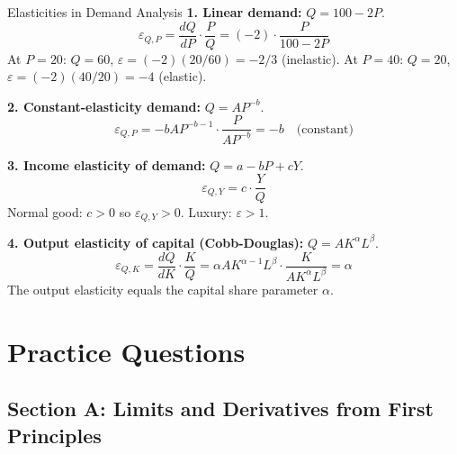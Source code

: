 \documentclass[12pt, a4paper]{article}
\theoremstyle{definition}
\newcommand{\ddd}[2]{\dfrac{d#1}{d#2}}
\begin{document}
\begin{exbox}{Elasticities in Demand Analysis}
\textbf{1. Linear demand:} $Q = 100 - 2P$.
\[
  \varepsilon_{Q,P} = \ddd{Q}{P}\cdot\frac{P}{Q}
                    = (-2)\cdot\frac{P}{100-2P}
\]
At $P=20$: $Q=60$, $\varepsilon = (-2)(20/60) = -2/3$ (inelastic).
At $P=40$: $Q=20$, $\varepsilon = (-2)(40/20) = -4$ (elastic).

\textbf{2. Constant-elasticity demand:} $Q = AP^{-b}$.
\[
  \varepsilon_{Q,P} = -bAP^{-b-1}\cdot\frac{P}{AP^{-b}}
                    = -b \quad\text{(constant)}
\]

\textbf{3. Income elasticity of demand:}
$Q = a - bP + cY$.
\[
  \varepsilon_{Q,Y} = c\cdot\frac{Y}{Q}
\]
Normal good: $c>0$ so $\varepsilon_{Q,Y}>0$.  Luxury: $\varepsilon>1$.

\textbf{4. Output elasticity of capital (Cobb-Douglas):}
$Q = AK^\alpha L^\beta$.
\[
  \varepsilon_{Q,K} = \ddd{Q}{K}\cdot\frac{K}{Q}
                    = \alpha AK^{\alpha-1}L^\beta\cdot\frac{K}{AK^\alpha L^\beta}
                    = \alpha
\]
The output elasticity equals the capital share parameter $\alpha$.
\end{exbox}

\section{Practice Questions}

\subsection{Section A: Limits and Derivatives from First Principles}
\end{document}
